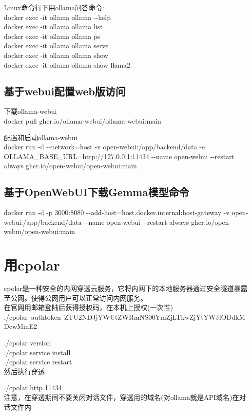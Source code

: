 \documentclass[10pt,a4paper]{article}
\begin{document}
\textrm{Linux}命令行下用\textrm{ollama}问答命令:\\
\textrm{docker exec -it ollama ollama -\/-help}\\
\textrm{docker exec -it ollama ollama list}\\
\textrm{docker exec -it ollama ollama ps}\\
\textrm{docker exec -it ollama ollama serve}\\
\textrm{docker exec -it ollama ollama show}\\
\textrm{docker exec -it ollama ollama show llama2}

\subsection{基于\rm{webui}配置\rm{web}版访问}
下载\textrm{ollama-webui}\\
\textrm{docker pull ghcr.io/ollama-webui/ollama-webui:main}

配置和启动\textrm{ollama-webui}\\
\textrm{docker run -d -\/-network=host -v open-webui:/app/backend/data -e OLLAMA\_BASE\_URL=http://127.0.0.1:11434 -\/-name open-webui -\/-restart always ghcr.io/open-webui/open-webui:main}

\subsection{基于\rm{OpenWebUI}下载\rm{Gemma}模型命令}
\textrm{docker run -d -p 3000:8080 -\/-add-host=host.docker.internal:host-gateway -v open-webui:/app/backend/data -\/-name open-webui -\/-restart always ghcr.io/open-webui/open-webui:main}

\section{用\textrm{cpolar}}
\textrm{cpolar}是一种安全的内网穿透云服务，它将内网下的本地服务器通过安全隧道暴露至公网。使得公网用户可以正常访问内网服务。\\
在官网用邮箱登陆后获得授权码，在本机上授权(一次性)\\
\textrm{./cpolar~authtoken~ZTU2NDJjYWUtZWRmNS00YmZjLTkwZjYtYWJlODdkMDcwMmE2}

\textrm{./cpolar version}\\
\textrm{./cpolar service install}\\
\textrm{./cpolar service restart }\\
然后执行穿透

\textrm{./cpolar http 11434}\\
注意，在穿透期间不要关闭对话文件，穿透用的域名(对\textrm{ollama}就是\textrm{API}域名)在对话文件内
\end{document}
